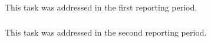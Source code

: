 \subparagraph{}
\label{dksbases@data-OEIS}
This task was addressed in the first reporting period.
\medskip

\subparagraph{}
\label{dksbases@data-findstat}
This task was addressed in the second reporting period.
\medskip

\subparagraph{}
\label{dksbases@data-LMFDB}

